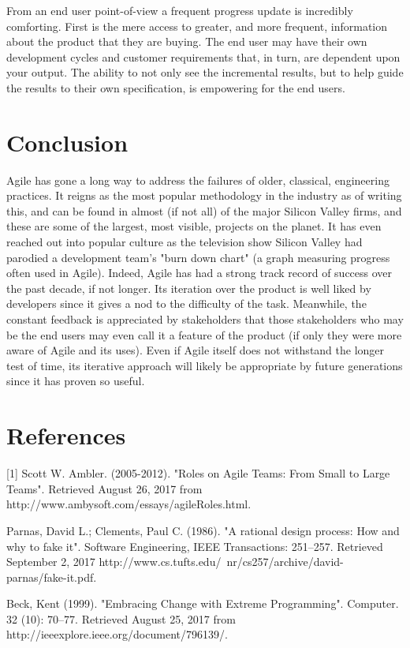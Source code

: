 \documentclass[format=acmsmall, review=false, screen=true, anonymous=True]{acmart}
\begin{document}
  From an end user point-of-view a frequent progress update is incredibly comforting. First is the mere access to greater, and more frequent, information about the product that they are buying. The end user may have their own development cycles and customer requirements that, in turn, are dependent upon your output. The ability to not only see the incremental results, but to help guide the results to their own specification, is empowering for the end users.

\section{Conclusion}
Agile has gone a long way to address the failures of older, classical, engineering practices. It reigns as the most popular methodology in the industry as of writing this, and can be found in almost (if not all) of the major Silicon Valley firms, and these are some of the largest, most visible, projects on the planet. It has even reached out into popular culture as the television show Silicon Valley had parodied a development team’s "burn down chart" (a graph measuring progress often used in Agile). Indeed, Agile has had a strong track record of success over the past decade, if not longer. Its iteration over the product is well liked by developers since it gives a nod to the difficulty of the task. Meanwhile, the constant feedback is appreciated by stakeholders that those stakeholders who may be the end users may even call it a feature of the product (if only they were more aware of Agile and its uses). Even if Agile itself does not withstand the longer test of time, its iterative approach will likely be appropriate by future generations since it has proven so useful.

\section*{References}
[1]  Scott W. Ambler. (2005-2012). "Roles on Agile Teams: From Small to Large Teams".
 Retrieved August 26, 2017 from http://www.ambysoft.com/essays/agileRoles.html.

\noindent[2] Parnas, David L.; Clements, Paul C. (1986). "A rational design process: How and why to fake it". Software Engineering, IEEE Transactions: 251–257. Retrieved September 2, 2017 http://www.cs.tufts.edu/~nr/cs257/archive/david-parnas/fake-it.pdf.

\noindent[3] Beck, Kent (1999). "Embracing Change with Extreme Programming". Computer. 32 (10): 70–77. Retrieved August 25, 2017 from http://ieeexplore.ieee.org/document/796139/.
\end{document}
